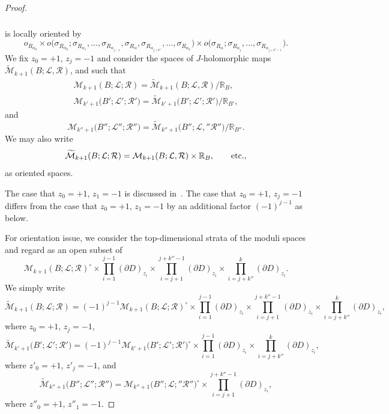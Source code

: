 \documentclass[pdftex]{sigma}
\numberwithin{equation}{section}
\theoremstyle{definition}
\begin{document}
\begin{proof}
\begin{gather*}
\begin{split}
\end{split}
\end{gather*}
is locally oriented by
\[o_{R_{\alpha_0}} \times o\bigl(\sigma_{R_{\alpha_0}};\sigma_{R_{\alpha_1}}, \dots, \sigma_{R_{\alpha_{j-1}}}, \sigma_{R_\alpha}, \sigma_{R_{\alpha_{j+k''}}}, \dots, \sigma_{R_{\alpha_k}} \bigr)
\times o\bigl(\sigma_{R_{\alpha}}; \sigma_{R_{\alpha_j}}, \dots, \sigma_{R_{\alpha_{j+k''-1}}}\bigr).\]
We fix $z_0=+1$, $z_j=-1$ and consider the spaces of $J$-holomorphic maps $\widetilde{\mathcal M}_{k+1}(B;{\mathcal L}, {\mathcal R})$,
 and  such that
\begin{gather*}
{\mathcal M}_{k+1}(B;{\mathcal L};{\mathcal R})=\widetilde{\mathcal M}_{k+1}(B;{\mathcal L}, {\mathcal R})/{\mathbb R}_B,\\
{\mathcal M}_{k'+1}\bigl(B';{\mathcal L}';{\mathcal R}'\bigr)=\widetilde{\mathcal M}_{k'+1}\bigl(B';{\mathcal L}';{\mathcal R}'\bigr)/{\mathbb R}_{B'},
\end{gather*}
and
\[{\mathcal M}_{k''+1}\bigl(B'';{\mathcal L}'';{\mathcal R}''\bigr)=\widetilde{\mathcal M}_{k''+1}\bigl(B'';{\mathcal L},'' {\mathcal R}''\bigr)/{\mathbb R}_{B''}.\]
We may also write
\[\widetilde{\mathcal M}_{k+1}(B;{\mathcal L};{\mathcal R})={\mathcal M}_{k+1}(B;{\mathcal L}, {\mathcal R}) \times {\mathbb R}_B, \qquad {\rm etc.},\]
as oriented spaces.

The case that $z_0=+1$, $z_1 = -1$ is discussed in~\cite[p.~699]{FOOO09II}. The case that $z_0=+1$, $z_j = -1$ differs from the case that $z_0=+1$, $z_1 = -1$ by
an additional factor $(-1)^{j-1}$ as below.

For orientation issue, we consider the top-dimensional strata of the moduli spaces and regard
 as an open subset of
\[
{\mathcal M}_{k+1}(B;{\mathcal L};{\mathcal R})^{\circ} \times \prod_{i=1}^{j-1}(\partial D)_{z_i} \times
\prod_{i=j+1}^{j+k''-1}(\partial D)_{z_i} \times \prod_{i=j+k''}^k (\partial D)_{z_i}.
\]
We simply write
\[\widetilde{\mathcal M}_{k+1}(B;{\mathcal L};{\mathcal R})=(-1)^{j-1} {\mathcal M}_{k+1}(B;{\mathcal L};{\mathcal R})^{\circ} \times \prod_{i=1}^{j-1}(\partial D)_{z_i} \times
\prod_{i=j+1}^{j+k''-1}(\partial D)_{z_i} \times \prod_{i=j+k''}^k (\partial D)_{z_i},\]
where $z_0 = +1$, $z_j=-1$,
\[\widetilde{\mathcal M}_{k'+1}\bigl(B';{\mathcal L}';{\mathcal R}'\bigr)= (-1)^{j-1}{\mathcal M}_{k'+1}\bigl(B';{\mathcal L}';{\mathcal R}'\bigr)^{\circ} \times \prod_{i=1}^{j-1}(\partial D)_{z_i} \times
\prod_{i=j+k''}^k (\partial D)_{z_i},\]
where $z'_0=+1$, $z'_j=-1$,
and
\[\widetilde{\mathcal M}_{k''+1}\bigl(B'';{\mathcal L}'';{\mathcal R}''\bigr)= {\mathcal M}_{k''+1}\bigl(B'';{\mathcal L};''{\mathcal R}''\bigr)^{\circ} \times
\prod_{i=j+1}^{j+k''-1}(\partial D)_{z_i},\]
where $z''_0=+1$, $z''_1=-1$.


\end{proof}
\end{document}
